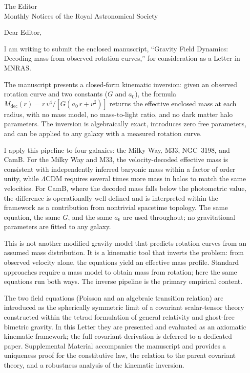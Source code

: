 \documentclass[11pt]{letter}
\begin{document}
\begin{letter}{The Editor\\Monthly Notices of the Royal Astronomical Society}

\opening{Dear Editor,}

I am writing to submit the enclosed manuscript, ``Gravity Field Dynamics: Decoding mass from observed rotation curves,'' for consideration as a Letter in MNRAS.

The manuscript presents a closed-form kinematic inversion: given an observed rotation curve and two constants ($G$ and $a_0$), the formula $M_{\mathrm{dec}}(r) = r\,v^4 / [G(a_0\,r + v^2)]$ returns the effective enclosed mass at each radius, with no mass model, no mass-to-light ratio, and no dark matter halo parameters. The inversion is algebraically exact, introduces zero free parameters, and can be applied to any galaxy with a measured rotation curve.

I apply this pipeline to four galaxies: the Milky Way, M33, NGC~3198, and CamB. For the Milky Way and M33, the velocity-decoded effective mass is consistent with independently inferred baryonic mass within a factor of order unity, while $\Lambda$CDM requires several times more mass in halos to match the same velocities. For CamB, where the decoded mass falls below the photometric value, the difference is operationally well defined and is interpreted within the framework as a contribution from nontrivial spacetime topology. The same equation, the same $G$, and the same $a_0$ are used throughout; no gravitational parameters are fitted to any galaxy.

This is not another modified-gravity model that predicts rotation curves from an assumed mass distribution. It is a kinematic tool that inverts the problem: from observed velocity alone, the equations yield an effective mass profile. Standard approaches require a mass model to obtain mass from rotation; here the same equations run both ways. The inverse pipeline is the primary empirical content.

The two field equations (Poisson and an algebraic transition relation) are introduced as the spherically symmetric limit of a covariant scalar-tensor theory constructed within the tetrad formulation of general relativity and ghost-free bimetric gravity. In this Letter they are presented and evaluated as an axiomatic kinematic framework; the full covariant derivation is deferred to a dedicated paper. Supplemental Material accompanies the manuscript and provides a uniqueness proof for the constitutive law, the relation to the parent covariant theory, and a robustness analysis of the kinematic inversion.


\end{letter}
\end{document}
